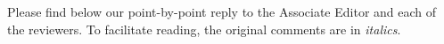 \documentclass[11pt]{article}
\begin{document}
Please find below our point-by-point reply to the Associate Editor and each of the reviewers. To facilitate reading, the original comments are in {\it italics}.


%
%
%
%
%
%
%
%
%
%
%
\end{document}
